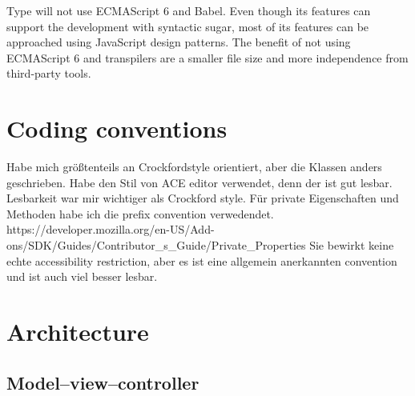 Type will not use ECMAScript 6 and Babel. Even though its features can support the development with syntactic sugar, most of its features can be approached using JavaScript design patterns. The benefit of not using ECMAScript 6 and transpilers are a smaller file size and more independence from third-party tools.

\section{Coding conventions}

Habe mich größtenteils an Crockfordstyle orientiert, aber die Klassen anders geschrieben. Habe den Stil von ACE editor verwendet, denn der ist gut lesbar. Lesbarkeit war mir wichtiger als Crockford style. Für private Eigenschaften und Methoden habe ich die prefix convention verwedendet.
https://developer.mozilla.org/en-US/Add-ons/SDK/Guides/Contributor\_s\_Guide/Private\_Properties
Sie bewirkt keine echte accessibility restriction, aber es ist eine allgemein anerkannten convention und ist auch viel besser lesbar.


\section{Architecture}



\subsection{Model--view--controller}

